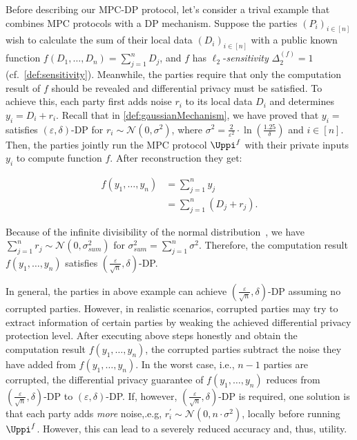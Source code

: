 Before describing our MPC-DP protocol, let's consider a trival example that combines MPC protocols with a DP mechanism. Suppose the parties $\left(P_{i}\right)_{i \in \left[ n\right]} $ wish to calculate the sum of their local data $\left(D_{i}\right)_{i \in \left[ n\right]} $ with a public known function $f\left(D_1,\ldots,D_n\right)=\sum_{j=1}^{n} D_j$, and $f$ has $\ell_2$-\textit{sensitivity} $\Delta^{\left(f\right) } _2=1$ (cf.~\autoref{def:sensitivity}). Meanwhile, the parties require that only the computation result of $f$ should be revealed and differential privacy must be satisfied. To achieve this, each party first adds noise $r_i$ to its local data $D_i$ and determines $ y_{i}=D_{i} +r_{i}$. Recall that in \autoref{def:gaussianMechanism}, we have proved that $ y_{i}=$ satisfies $\left(\varepsilon ,\delta \right) $-DP for $r_i \sim \mathcal{N}\left( 0,\sigma ^{2}\right) $, where $\sigma ^{2}=\frac{2}{\varepsilon ^2}\cdot\ln\left(\frac{1.25}{\delta }\right)$ and $i\in \left[n\right] $. Then, the parties jointly run the MPC protocol $\Uppi^{f}$ with their private inputs $y_i$ to compute function $f$. After reconstruction they get:

\begin{equation}
	\begin{split}
		f\left(y_1,\ldots,y_n\right)&=\sum_{j=1}^{n} y_j\\
		&=\sum_{j=1}^{n}\left( D_j+ r_j\right).
	\end{split}
\end{equation}

Because of the infinite divisibility of the normal distribution~\cite{patel1996handbook}, we have $\sum_{j=1}^{n} r_j \sim \mathcal{N}\left( 0,\sigma_{sum} ^{2}\right) $ for $\sigma_{sum} ^{2}=\sum ^{n}_{j=1}\sigma ^{2}$. Therefore, the computation result $f\left(y_1,\ldots,y_n\right)$ satisfies $\left(\frac{\varepsilon}{\sqrt{n}},\delta \right) $-DP.

In general, the parties in above example can achieve $\left(\frac{\varepsilon}{\sqrt{n}},\delta \right) $-DP assuming no corrupted parties. However, in realistic scenarios, corrupted parties may try to extract information of certain parties by weaking the achieved differential privacy protection level.
After executing above steps honestly and obtain the computation result $f\left(y_1,\ldots,y_n\right)$, the corrupted parties subtract the noise they have added from $f\left(y_1,\ldots,y_n\right)$. In the worst case, i.e., $n-1$ parties are corrupted, the differential privacy guarantee of $f\left(y_1,\ldots,y_n\right)$ reduces from $\left(\frac{\varepsilon}{\sqrt{n}},\delta \right) $-DP to $\left(\varepsilon,\delta \right) $-DP. If, however, $\left(\frac{\varepsilon}{\sqrt{n}},\delta \right) $-DP is required, one solution is that each party adds \textit{more} noise,.e.g, $r_i^{\prime} \sim \mathcal{N}\left( 0,n\cdot \sigma ^{2}\right) $, locally before running $\Uppi^{f}$. However, this can lead to a severely reduced accuracy and, thus, utility.

